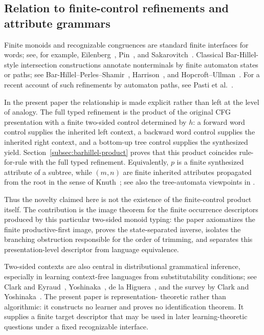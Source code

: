 \documentclass[sub]{jalc}
\begin{document}
\subsection{Relation to finite-control refinements and attribute grammars}
\label{subsec:related-work}

Finite monoids and recognizable congruences are standard finite interfaces for
words; see, for example, Eilenberg~\cite{eilenberg1974}, Pin~\cite{pin1986},
and Sakarovitch~\cite{sakarovitch2009}.  Classical Bar-Hillel-style
intersection constructions annotate nonterminals by finite automaton states or
paths; see Bar-Hillel--Perles--Shamir~\cite{bar-hillel-perles-shamir1961},
Harrison~\cite{harrison1978}, and Hopcroft--Ullman~\cite{hopcroft-ullman1979}.
For a recent account of such refinements by automaton paths, see Pasti et
al.~\cite{pasti-et-al2023}.

In the present paper the relationship is made explicit rather than left at the
level of analogy.  The full typed refinement is the product of the original CFG
presentation with a finite two-sided control determined by \(h\): a forward word
control supplies the inherited left context, a backward word control supplies
the inherited right context, and a bottom-up tree control supplies the
synthesized yield.  Section~\ref{subsec:barhillel-product} proves that this
product coincides rule-for-rule with the full typed refinement.  Equivalently,
\(p\) is a finite synthesized attribute of a subtree, while \((m,n)\) are finite
inherited attributes propagated from the root in the sense of
Knuth~\cite{knuth1968}; see also the tree-automata viewpoints in
\cite{gecseg-steinby1984,comon-et-al2007}.

Thus the novelty claimed here is not the existence of the finite-control product
itself.  The contribution is the image theorem for the finite occurrence
descriptors produced by this particular two-sided monoid typing: the paper
axiomatizes the finite productive-first image, proves the state-separated
inverse, isolates the branching obstruction responsible for the order of
trimming, and separates this presentation-level descriptor from language
equivalence.

Two-sided contexts are also central in distributional grammatical inference,
especially in learning context-free languages from substitutability conditions;
see Clark and Eyraud~\cite{clark-eyraud2007}, Yoshinaka~\cite{yoshinaka2008},
de la Higuera~\cite{higuera2010}, and the survey by Clark and
Yoshinaka~\cite{clark-yoshinaka2016}.  The present paper is representation-
theoretic rather than algorithmic: it constructs no learner and proves no
identification theorem.  It supplies a finite target descriptor that may be used
in later learning-theoretic questions under a fixed recognizable interface.
\end{document}
